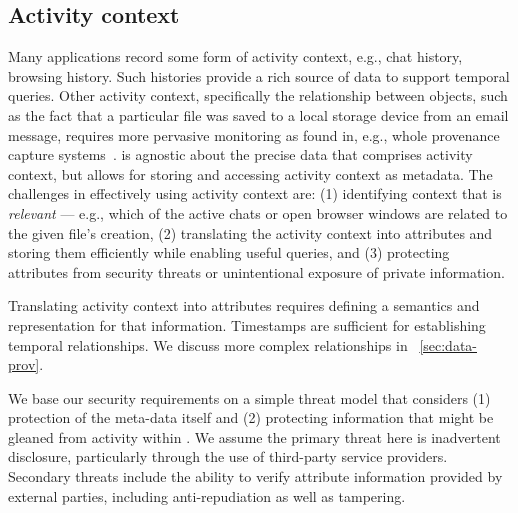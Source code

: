 \subsection{Activity context}
\label{sec:activity-context}
Many applications record some form of activity context, e.g., chat history, browsing history.
Such histories provide a rich source of data to support temporal queries.
Other activity context, specifically the relationship between objects, such as the fact that a particular file was saved to a local storage device from an email message, requires more pervasive monitoring as found in, e.g., whole provenance capture systems~\cite{camflow}.
\system is agnostic about the precise data that comprises activity context, but allows for storing and accessing activity context as metadata.
The challenges in effectively using activity context are: (1) identifying context that is \emph{relevant} --- e.g., which of the active chats or open browser windows are related to the given file's creation, (2) translating the activity context into attributes and storing them efficiently while enabling useful queries, and (3) protecting attributes from security threats or unintentional exposure of private information.


Translating activity context into attributes requires defining a semantics and representation for that information.
Timestamps are sufficient for establishing temporal relationships.
We discuss more complex relationships in ~\autoref{sec:data-prov}.

We base our security requirements on a simple threat model that considers (1) protection of the meta-data itself and (2) protecting information that might be gleaned from activity within \system.  We assume the primary threat here is inadvertent disclosure, particularly through the use of third-party service providers. Secondary threats include the ability to verify attribute information provided by external parties, including anti-repudiation as well as tampering. 

